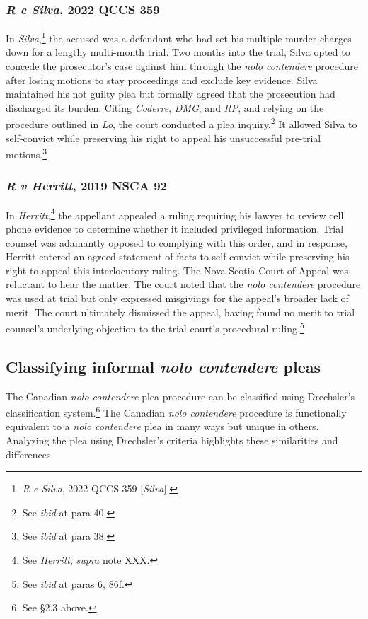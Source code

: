 \subsubsection{\textit{R c Silva}, 2022 QCCS 359}

In \textit{Silva},\footnote{\textit{R c Silva}, 2022 QCCS 359 [\textit{Silva}].} the accused was a defendant who had set his multiple murder charges down for a lengthy multi-month trial. Two months into the trial, Silva opted to concede the prosecutor's case against him through the \textit{nolo contendere} procedure after losing motions to stay proceedings and exclude key evidence. Silva maintained his not guilty plea but formally agreed that the prosecution had discharged its burden. Citing \textit{Coderre}, \textit{DMG}, and \textit{RP}, and relying on the procedure outlined in \textit{Lo}, the court conducted a plea inquiry.\footnote{See \textit{ibid} at para 40.} It allowed Silva to self-convict while preserving his right to appeal his unsuccessful pre-trial motions.\footnote{See \textit{ibid} at para 38.}

\subsubsection{\textit{R v Herritt}, 2019 NSCA 92}

In \textit{Herritt},\footnote{See \textit{Herritt}, \textit{supra} note XXX.} the appellant appealed a ruling requiring his lawyer to review cell phone evidence to determine whether it included privileged information. Trial counsel was adamantly opposed to complying with this order, and in response, Herritt entered an agreed statement of facts to self-convict while preserving his right to appeal this interlocutory ruling. The Nova Scotia Court of Appeal was reluctant to hear the matter. The court noted that the \textit{nolo contendere} procedure was used at trial but only expressed misgivings for the appeal's broader lack of merit. The court ultimately dismissed the appeal, having found no merit to trial counsel's underlying objection to the trial court's procedural ruling.\footnote{See \textit{ibid} at paras 6, 86f.}

\subsection{Classifying informal \textit{nolo contendere} pleas}

The Canadian \textit{nolo contendere} plea procedure can be classified using Drechsler's classification system.\footnote{See §2.3 above.} The Canadian \textit{nolo contendere} procedure is functionally equivalent to a \textit{nolo contendere} plea in many ways but unique in others. Analyzing the plea using Drechsler's criteria highlights these similarities and differences.

